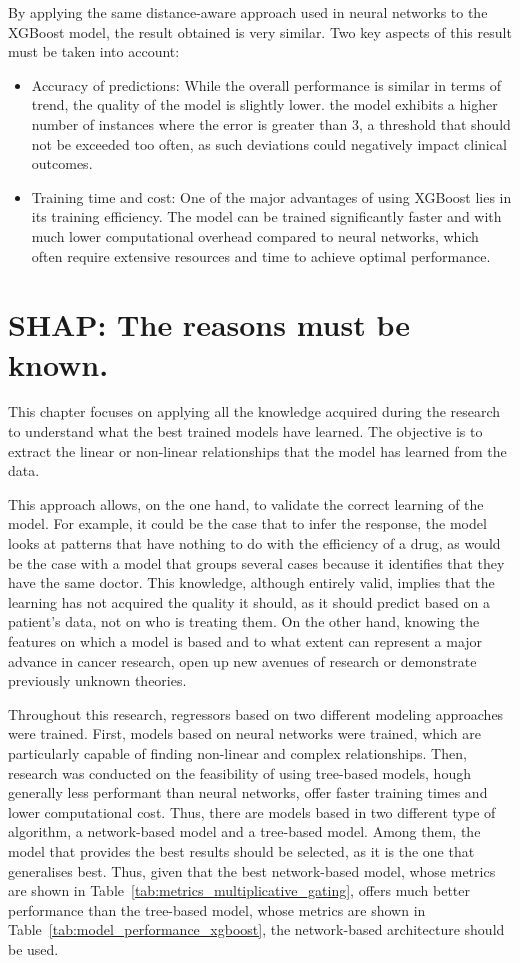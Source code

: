 By applying the same distance-aware approach used in neural networks to the XGBoost model, the result obtained is very similar. Two key aspects of this result must be taken into account:

\begin{itemize}
    \item Accuracy of predictions: While the overall performance is similar in terms of trend, the quality of the model is slightly lower. the model exhibits a higher number of instances where the error is greater than 3, a threshold that should not be exceeded too often, as such deviations could negatively impact clinical outcomes.
    \item Training time and cost: One of the major advantages of using XGBoost lies in its training efficiency. The model can be trained significantly faster and with much lower computational overhead compared to neural networks, which often require extensive resources and time to achieve optimal performance.
\end{itemize}


\section{SHAP: The reasons must be known.}

This chapter focuses on applying all the knowledge acquired during the research to understand what the best trained models have learned. The objective is to extract the linear or non-linear relationships that the model has learned from the data.

This approach allows, on the one hand, to validate the correct learning of the model. For example, it could be the case that to infer the response, the model looks at patterns that have nothing to do with the efficiency of a drug, as would be the case with a model that groups several cases because it identifies that they have the same doctor. This knowledge, although entirely valid, implies that the learning has not acquired the quality it should, as it should predict based on a patient's data, not on who is treating them. On the other hand, knowing the features on which a model is based and to what extent can represent a major advance in cancer research, open up new avenues of research or demonstrate previously unknown theories.

Throughout this research, regressors based on two different modeling approaches were trained. First, models based on neural networks were trained, which are particularly capable of finding non-linear and complex relationships. Then, research was conducted on the feasibility of using tree-based models, hough generally less performant than neural networks, offer faster training times and lower computational cost. Thus, there are models based in two different type of algorithm, a network-based model and a tree-based model. Among them, the model that provides the best results should be selected, as it is the one that generalises best. Thus, given that the best network-based model, whose metrics are shown in Table~\ref{tab:metrics_multiplicative_gating}, offers much better performance than the tree-based model, whose metrics are shown in Table~\ref{tab:model_performance_xgboost}, the network-based architecture should be used.

